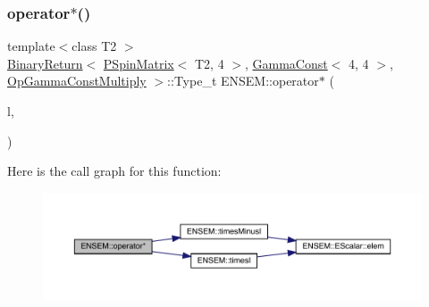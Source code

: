 \subsubsection{\texorpdfstring{operator$\ast$()}{operator*()}\hspace{0.1cm}{\footnotesize\ttfamily [21/64]}}
{\footnotesize\ttfamily template$<$class T2 $>$ \\
\mbox{\hyperlink{structENSEM_1_1BinaryReturn}{Binary\+Return}}$<$ \mbox{\hyperlink{classENSEM_1_1PSpinMatrix}{P\+Spin\+Matrix}}$<$ T2, 4 $>$, \mbox{\hyperlink{classENSEM_1_1GammaConst}{Gamma\+Const}}$<$ 4, 4 $>$, \mbox{\hyperlink{structENSEM_1_1OpGammaConstMultiply}{Op\+Gamma\+Const\+Multiply}} $>$\+::Type\+\_\+t E\+N\+S\+E\+M\+::operator$\ast$ (\begin{DoxyParamCaption}\item[{const \mbox{\hyperlink{classENSEM_1_1PSpinMatrix}{P\+Spin\+Matrix}}$<$ T2, 4 $>$ \&}]{l,  }\item[{const \mbox{\hyperlink{classENSEM_1_1GammaConst}{Gamma\+Const}}$<$ 4, 4 $>$ \&}]{ }\end{DoxyParamCaption})\hspace{0.3cm}{\ttfamily [inline]}}

Here is the call graph for this function\+:\nopagebreak
\begin{figure}[H]
\begin{center}
\leavevmode
\includegraphics[width=350pt]{d6/df5/group__primspinmatrix_gafa880313515ac76955c6c4de7513add3_cgraph}
\end{center}
\end{figure}
\mbox{\label{group__primspinmatrix_ga02ed9e6e920eca4f600dd06655fb2a42}} 
